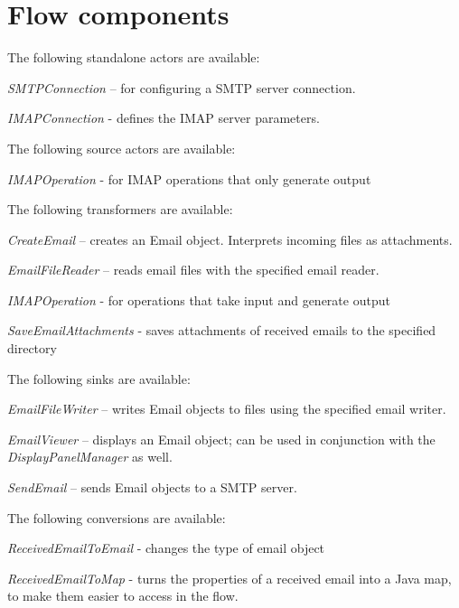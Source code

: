 \documentclass[a4paper]{book}
\begin{document}
\clearpage
\section{Flow components}
The following standalone actors are available:
\begin{tight_itemize}
	\item \textit{SMTPConnection} -- for configuring a SMTP server connection.
    \item \textit{IMAPConnection} - defines the IMAP server parameters.
\end{tight_itemize}
The following source actors are available:
\begin{tight_itemize}
    \item \textit{IMAPOperation} - for IMAP operations that only generate output
\end{tight_itemize}
The following transformers are available:
\begin{tight_itemize}
	\item \textit{CreateEmail} -- creates an Email object. Interprets incoming files
	as attachments.
	\item \textit{EmailFileReader} -- reads email files with the specified email reader.
    \item \textit{IMAPOperation} - for operations that take input and generate output
    \item \textit{SaveEmailAttachments} - saves attachments of received emails to the specified directory
\end{tight_itemize}
The following sinks are available:
\begin{tight_itemize}
	\item \textit{EmailFileWriter} -- writes Email objects to files using the specified
	email writer.
	\item \textit{EmailViewer} -- displays an Email object; can be used in conjunction 
	with the \textit{DisplayPanelManager} as well.
	\item \textit{SendEmail} -- sends Email objects to a SMTP server.
\end{tight_itemize}
The following conversions are available:
\begin{tight_itemize}
    \item \textit{ReceivedEmailToEmail} - changes the type of email object
    \item \textit{ReceivedEmailToMap} - turns the properties of a received email into a
    Java map, to make them easier to access in the flow.
\end{tight_itemize}
\end{document}
